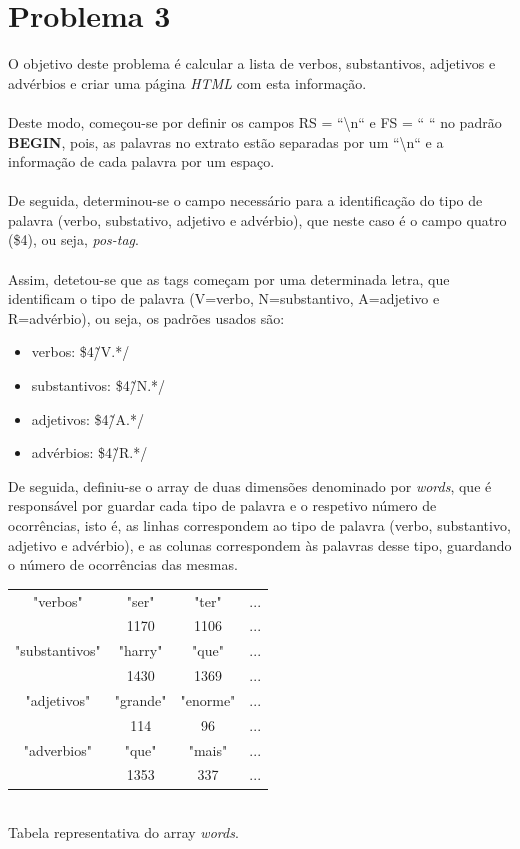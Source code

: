 \documentclass[11pt,a4paper]{report}%
\begin{document}
\section{Problema 3}
O objetivo deste problema é calcular a lista de verbos, substantivos, adjetivos e advérbios e criar uma página \emph{HTML} com esta informação.
\\\\Deste modo, começou-se por definir os campos RS = ``\textbackslash n`` e FS = `` `` no padrão \textbf{BEGIN}, pois, as palavras no extrato estão separadas por um ``\textbackslash n`` e a informação de cada palavra por um espaço.
\\\\De seguida, determinou-se o campo necessário para a identificação do tipo de palavra (verbo, substativo, adjetivo e advérbio), que neste caso é o campo quatro (\$4), ou seja, \emph{pos-tag}.
\\\\Assim, detetou-se que as tags começam  por uma determinada letra, que identificam o tipo de palavra (V=verbo, N=substantivo, A=adjetivo e R=advérbio), ou seja, os padrões usados são:

\begin{itemize}
  \item verbos: \$4\~/V.*/
  \item substantivos: \$4\~/N.*/ 
  \item adjetivos: \$4\~/A.*/ 
  \item advérbios: \$4\~/R.*/
\end{itemize}

De seguida, definiu-se o array de duas dimensões denominado por \emph{words}, que é responsável por guardar cada tipo de palavra e o respetivo número de ocorrências, isto é, as linhas correspondem ao tipo de palavra (verbo, substantivo, adjetivo e advérbio), e as colunas correspondem às palavras desse tipo, guardando o número de ocorrências das mesmas.

\begin{center}
\begin{tabular}{ |c|c|c|c| } 
 \hline
"verbos"  & "ser" & "ter" & ...\\ 
          & 1170 & 1106 & ...\\
 \hline
 "substantivos"& "harry" & "que" & ... \\
               & 1430 & 1369 & ...\\
 \hline
 "adjetivos"& "grande" & "enorme" & ...\\
            & 114 & 96 & ...\\
 \hline
"adverbios" & "que" & "mais" & ...\\
            & 1353 & 337 & ...\\ 
 \hline
\end{tabular}
\caption{\label{tab:table-name}\\Tabela representativa do array \emph{words}.}
\end{center}
\end{document}
